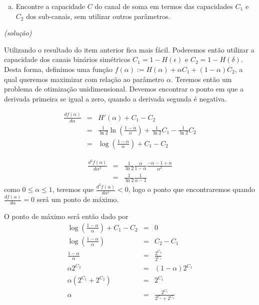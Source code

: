 \begin{frame}[allowframebreaks]
\begin{exercise}
  \exercisebreak
  \begin{enumerate}[e)]
  \item Encontre a capacidade $C$ do canal de soma em termos das capacidades $C_1$ e $C_2$
  dos sub-canais, sem utilizar outros parâmetros.
  \end{enumerate}
  \textit{(solução)}

  Utilizando o resultado do item anterior fica mais fácil. 
  Poderemos então utilizar a capacidade dos canais binários simétricos 
  $C_1 = 1 - H(\epsilon)$ e $C_2 = 1 - H(\delta)$.
  Desta forma, definimos uma função $f(\alpha) := H(\alpha) + \alpha C_1 + (1-\alpha) C_2$,
  a qual queremos maximizar com relação ao parâmetro $\alpha$. Teremos então um problema
  de otimização unidimensional. Devemos encontrar o ponto em que a derivada primeira 
  se igual a zero, quando a derivada segunda é negativa.

  \exercisebreak

  \begin{eqnarray}
  \frac{d f(\alpha)}{d \alpha} &=& H'(\alpha) + C_1 - C_2 \nonumber \\
	&=& \frac{1}{\ln 2} \ln \left( \frac{1-\alpha}{\alpha} \right) + \frac{1}{\ln 2} C_1 - \frac{1}{\ln 2} C_2 \nonumber \\
	&=& \log \left( \frac{1-\alpha}{\alpha} \right) + C_1 - C_2
  \end{eqnarray}

  \exercisebreak
  \begin{eqnarray}
  \frac{d^2 f(\alpha)}{d \alpha^2} &=& \frac{1}{\ln 2} \frac{\alpha}{1 - \alpha} \frac{- \alpha - 1 + \alpha}{\alpha^2} \nonumber \\
	&=& \frac{1}{\ln 2} \frac{1}{\alpha - 1}
  \end{eqnarray}
  como $0 \leq \alpha \leq 1$, teremos que $\frac{d^2 f(\alpha)}{d \alpha^2} < 0$, logo o ponto que 
  encontraremos quando $\frac{d f(\alpha)}{d \alpha} = 0$ será um ponto de máximo.

  \exercisebreak

  \vspace{-1em}
  O ponto de máximo será então dado por
  \begin{eqnarray}
  \log \left( \frac{1-\alpha}{\alpha} \right) + C_1 - C_2 &=& 0 \nonumber \\
  \log \left( \frac{1-\alpha}{\alpha} \right) &=& C_2 - C_1 \nonumber \\
  \frac{1-\alpha}{\alpha} &=& \frac{2^{C_2}}{2^{C_1}} \nonumber \\
  \alpha 2^{C_2} &=& (1-\alpha) 2^{C_1} \nonumber \\
  \alpha (2^{C_1} + 2^{C_2}) &=& 2^{C_1} \nonumber \\
  \alpha &=& \frac{2^{C_1}}{2^{C_1} + 2^{C_2}}
  \end{eqnarray}


\end{exercise}
\end{frame}
